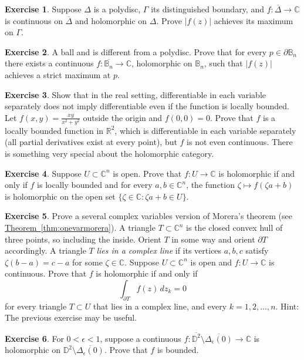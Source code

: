 \documentclass[12pt,openany]{book}
\newcommand{\sabs}[1]{\lvert {#1} \rvert}
\newcommand{\C}{{\mathbb{C}}}
\newcommand{\R}{{\mathbb{R}}}
\newcommand{\D}{{\mathbb{D}}}
\newcommand{\bB}{{\mathbb{B}}}
\theoremstyle{plain}
\theoremstyle{remark}
\theoremstyle{definition}
\newenvironment{exbox}{%
    \def\FrameCommand{\vrule width 1pt \relax\hspace{10pt}}%
    \MakeFramed{\advance\hsize-\width\FrameRestore}%
}{%
    \endMakeFramed
}
\theoremstyle{exercise}
\newtheorem{exercise}{Exercise}[section]
\theoremstyle{example}
\newcommand{\thmref}[1]{\hyperref[#1]{Theorem~\ref*{#1}}}
\begin{document}
\begin{exbox}
\begin{exercise}
Suppose $\Delta$ is a polydisc, $\Gamma$ its distinguished boundary,
and $f \colon \overline{\Delta} \to \C$ is continuous on $\overline{\Delta}$
and holomorphic on $\Delta$.
Prove
$\sabs{f(z)}$ achieves its maximum on $\Gamma$.
\end{exercise}

\begin{exercise}
A ball and is different from a polydisc.  Prove that for every $p \in \partial \bB_n$
there exists a continuous $f \colon \overline{\bB_n} \to \C$, holomorphic
on $\bB_n$, such that $\sabs{f(z)}$ achieves a strict maximum at $p$.
\end{exercise}

\begin{exercise}
Show that in the real setting, differentiable
in each variable separately does not imply differentiable even if
the function is locally bounded.
Let $f(x,y) = \frac{xy}{x^2+y^2}$ outside the origin
and $f(0,0) = 0$.  Prove that $f$ is a
locally bounded function in $\R^2$, which is differentiable
in each variable separately (all partial derivatives exist at every point),
but $f$ is not even continuous.  There is something very
special about the holomorphic category.
\end{exercise}

\begin{exercise}
Suppose $U \subset \C^n$ is open.
Prove that $f \colon U \to \C$ is holomorphic if and only if
$f$ is locally bounded and
for every $a,b \in \C^n$, the
function
$\zeta \mapsto f(\zeta a + b)$ is holomorphic on
the open set $\{ \zeta \in \C : \zeta a + b \in U \}$.
\end{exercise}

\begin{exercise}
Prove a several complex variables version of Morera's theorem (see
\thmref{thm:onevarmorera}).
A triangle $T \subset \C^n$ is the closed convex hull of three points, so
including the inside.  Orient $T$ in some way %
and orient $\partial T$ accordingly.
A triangle $T$ \emph{lies in a complex line} if
its vertices $a,b,c$ satisfy
$\zeta (b-a) = c-a$ for some $\zeta \in \C$.
Suppose $U \subset \C^n$ is open and $f \colon U \to \C$ is continuous.
Prove that $f$ is holomorphic if and only if
\begin{equation*}
\int_{\partial T} f(z) \, dz_k = 0
\end{equation*}
for every triangle $T \subset U$ that lies in a complex line,
and every $k=1,2,\ldots,n$.
Hint: The previous exercise may be useful.
\end{exercise}

\begin{exercise}
For $0 < \epsilon < 1$,
suppose a continuous
$f \colon \overline{\D^2} \setminus \overline{\Delta_\epsilon(0)} \to \C$ is holomorphic
on $\D^2 \setminus \overline{\Delta_\epsilon(0)}$.
Prove that $f$ is bounded.
\end{exercise}
\end{exbox}
\end{document}
